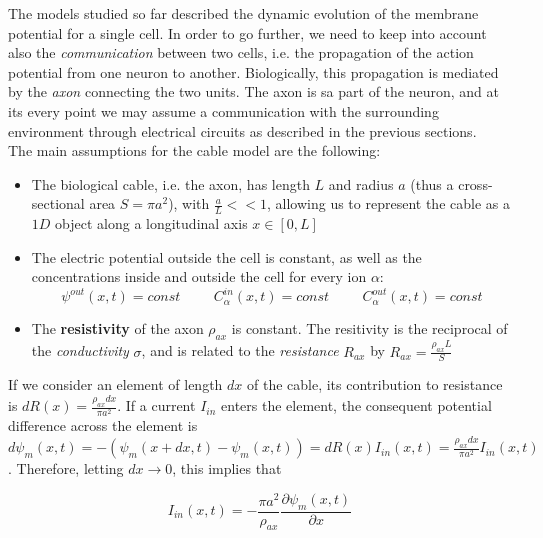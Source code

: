 \documentclass[a4paper]{article}
\begin{document}
The models studied so far described the dynamic evolution of the membrane potential  for a single cell. In order to go further, we need to keep into account also the \textit{communication} between two cells, i.e. the propagation of the action potential from one neuron to another. Biologically, this propagation is mediated by the \textit{axon} connecting the two units. The axon is sa part of the neuron, and at its every point we may assume a communication with the surrounding environment through electrical circuits as described in the previous sections.\\
The main assumptions for the cable model are the following:

\begin{itemize}
	
	\item The biological cable, i.e. the axon, has length $L$ and radius $a$ (thus a cross-sectional area  $S=\pi a^2$), with $\frac{a}{L} << 1$, allowing us to represent the cable as a $1D$ object along a longitudinal axis $ x \in [0,L]$
	
	\item The electric potential outside the cell is constant, as well as the concentrations inside and outside the cell for every ion $\alpha$: 
	$$ \psi^{out}(x,t) = const  \hspace{1cm} C_\alpha^{in}(x,t)  = const \hspace{1cm} C_\alpha^{out}(x,t)  = const$$
	
	\item The \textbf{resistivity} of the axon $\rho_{ax}$ is constant. The resitivity is the reciprocal of the \textit{conductivity} $\sigma$, and is related to the \textit{resistance} $R_{ax}$ by $ R_{ax} = \frac{\rho_{ax} L}{S}$
	
	
\end{itemize}


If we consider an element of length $dx$ of the cable, its contribution to resistance is $dR(x) = \frac{\rho_{ax} dx}{\pi a^2}$. If a current $I_{in}$ enters the element, the consequent potential difference across the element is $ d\psi_m(x,t) = - \left(\psi_m(x+dx,t) - \psi_m(x,t)\right) = dR(x)I_{in}(x,t) = \frac{\rho_{ax} dx}{\pi a^2} I_{in}(x,t)$. Therefore, letting $dx \rightarrow 0$, this implies that

\begin{equation}
	I_{in}(x,t) = -\frac{\pi a^2}{\rho_{ax}}\frac{\partial \psi_m(x,t)}{\partial x}
\end{equation}
\end{document}
